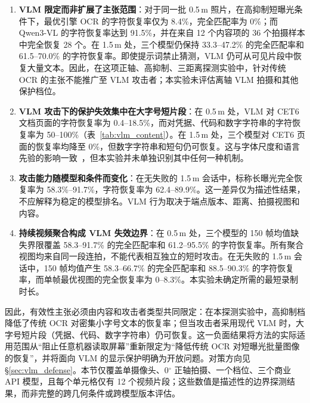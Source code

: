 \begin{enumerate}
\item \textbf{VLM 限定而非扩展了主张范围}：对于同一批 0.5\,m 照片，在高抑制短曝光条件下，最优引擎 OCR 的字符恢复率仅为 8.4\%，完全匹配率为 0\%；而 Qwen3-VL 的字符恢复率达到 91.5\%，并在来自 12 个内容项的 36 个拍摄样本中完全恢复 28 个。在 1.5\,m 处，三个模型仍保持 33.3--47.2\% 的完全匹配率和 61.5--70.0\% 的字符恢复率。即使提示词禁止猜测，VLM 仍可从可见片段中恢复大量文本。因此，在这项正轴、高抑制、三距离探测实验中，针对传统 OCR 的主张不能推广至 VLM 攻击者；本实验未评估离轴 VLM 拍摄和其他保护档位。

\item \textbf{VLM 攻击下的保护失效集中在大字号短片段}：在 0.5\,m 处，VLM 对 CET6 文档页面的字符恢复率为 0.4--18.5\%，而对凭据、代码和数字字符串的字符恢复率为 50--100\%（表~\ref{tab:vlm_content}）。在 1.5\,m 处，三个模型对 CET6 页面的恢复率均降至 0\%，但数字字符串和短句仍可恢复。这与字体尺度和语言先验的影响一致~\cite{b_shi2023,b_jiang2025}，但本实验并未单独识别其中任何一种机制。

\item \textbf{攻击能力随模型和条件而变化}：在无失败的 1.5\,m 会话中，标称长曝光完全恢复率为 58.3\%--91.7\%，字符恢复率为 62.4--89.9\%。这一差异仅为描述性结果，不应解释为稳定的模型排名。VLM 行为取决于端点版本、距离、拍摄视图和内容。

\item \textbf{持续视频聚合构成 VLM 失效边界}：在 0.5\,m 处，三个模型的 150 帧均值缺失界限覆盖 58.3--91.7\% 的完全匹配率和 61.2--95.5\% 的字符恢复率。所有聚合视图均来自同一段连拍，不能代表相互独立的短时攻击。在无失败的 1.5\,m 会话中，150 帧均值产生 58.3--66.7\% 的完全匹配率和 88.5--90.3\% 的字符恢复率，而单帧最优视图的完全恢复率为 0--8.3\%。本实验未确定所需的最短录制时长。
\end{enumerate}

因此，有效性主张必须由内容和攻击者类型共同限定：在本探测实验中，高抑制档降低了传统 OCR 对密集小字号文本的恢复率；但当攻击者采用现代 VLM 时，大字号短片段（凭据、代码、数字字符串）仍可恢复。这一负面结果将方法的实际适用范围从“阻止任意机器读取屏幕”重新限定为“降低传统 OCR 对短曝光批量图像的恢复”，并将面向 VLM 的显示保护明确为开放问题。对策方向见 \S\ref{sec:vlm_defense}。本节仅覆盖单摄像头、0$^{\circ}$ 正轴拍摄、一个档位、三个商业 API 模型，且每个单元格仅有 12 个视频片段；这些数值是描述性的边界探测结果，而非完整的跨几何条件或跨模型版本评估。

